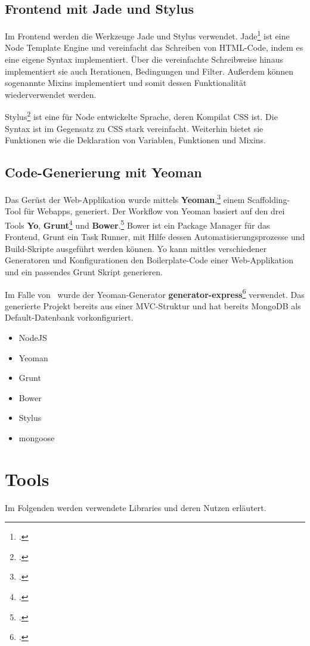 \subsection{Frontend mit Jade und Stylus}
Im Frontend werden die Werkzeuge Jade und Stylus verwendet. Jade\footcite{jade} ist eine Node Template Engine und vereinfacht das Schreiben von HTML-Code, indem es eine eigene Syntax implementiert. Über die vereinfachte Schreibweise hinaus implementiert sie auch Iterationen, Bedingungen und Filter. Außerdem können sogenannte Mixins implementiert und somit dessen Funktionalität wiederverwendet werden.

Stylus\footcite{stylus} ist eine für Node entwickelte Sprache, deren Kompilat CSS ist. Die Syntax ist im Gegensatz zu CSS stark vereinfacht. Weiterhin bietet sie Funktionen wie die Deklaration von Variablen, Funktionen und Mixins.

\subsection{Code-Generierung mit Yeoman}
Das Gerüst der Web-Applikation wurde mittels \textbf{Yeoman},\footcite{yeoman} einem Scaffolding-Tool für Webapps, generiert. Der Workflow von Yeoman basiert auf den drei Tools \textbf{Yo}, \textbf{Grunt}\footcite{grunt} und \textbf{Bower}.\footcite{bower} Bower ist ein Package Manager für das Frontend, Grunt ein Task Runner, mit Hilfe dessen Automatisierungsprozesse und Build-Skripte ausgeführt werden können. Yo kann mittles verschiedener Generatoren und Konfigurationen den Boilerplate-Code einer Web-Applikation und ein passendes Grunt Skript generieren.

Im Falle von \arbeitstitel \ wurde der Yeoman-Generator \textbf{generator-express}\footcite{yeoExpress} verwendet. Das generierte Projekt bereits aus einer MVC-Struktur und hat bereits MongoDB als Default-Datenbank vorkonfiguriert. 
\begin{itemize}
	\item NodeJS
	\item Yeoman
	\item Grunt
	\item Bower
	\item Stylus
	\item mongoose
\end{itemize}

\section{Tools}
Im Folgenden werden verwendete Libraries und deren Nutzen erläutert.


